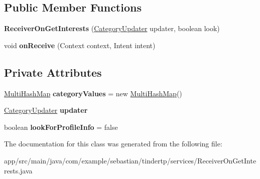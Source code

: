 \subsection*{Public Member Functions}
\begin{DoxyCompactItemize}
\item 
{\bfseries Receiver\+On\+Get\+Interests} (\hyperlink{interfacecom_1_1example_1_1sebastian_1_1tindertp_1_1CategoryUpdater}{Category\+Updater} updater, boolean look)\hypertarget{classcom_1_1example_1_1sebastian_1_1tindertp_1_1services_1_1ReceiverOnGetInterests_a1c6693804f8ebfe6e3bb2f0c51ab4de3}{}\label{classcom_1_1example_1_1sebastian_1_1tindertp_1_1services_1_1ReceiverOnGetInterests_a1c6693804f8ebfe6e3bb2f0c51ab4de3}

\item 
void {\bfseries on\+Receive} (Context context, Intent intent)\hypertarget{classcom_1_1example_1_1sebastian_1_1tindertp_1_1services_1_1ReceiverOnGetInterests_a2617638cb16a02c326c19216f5ddac71}{}\label{classcom_1_1example_1_1sebastian_1_1tindertp_1_1services_1_1ReceiverOnGetInterests_a2617638cb16a02c326c19216f5ddac71}

\end{DoxyCompactItemize}
\subsection*{Private Attributes}
\begin{DoxyCompactItemize}
\item 
\hyperlink{classcom_1_1example_1_1sebastian_1_1tindertp_1_1commonTools_1_1MultiHashMap}{Multi\+Hash\+Map} {\bfseries category\+Values} = new \hyperlink{classcom_1_1example_1_1sebastian_1_1tindertp_1_1commonTools_1_1MultiHashMap}{Multi\+Hash\+Map}()\hypertarget{classcom_1_1example_1_1sebastian_1_1tindertp_1_1services_1_1ReceiverOnGetInterests_a8c47e83a2fbb6717d366a23347f856fe}{}\label{classcom_1_1example_1_1sebastian_1_1tindertp_1_1services_1_1ReceiverOnGetInterests_a8c47e83a2fbb6717d366a23347f856fe}

\item 
\hyperlink{interfacecom_1_1example_1_1sebastian_1_1tindertp_1_1CategoryUpdater}{Category\+Updater} {\bfseries updater}\hypertarget{classcom_1_1example_1_1sebastian_1_1tindertp_1_1services_1_1ReceiverOnGetInterests_ab0981cfbf9c8c630e913828c5f3e5eae}{}\label{classcom_1_1example_1_1sebastian_1_1tindertp_1_1services_1_1ReceiverOnGetInterests_ab0981cfbf9c8c630e913828c5f3e5eae}

\item 
boolean {\bfseries look\+For\+Profile\+Info} = false\hypertarget{classcom_1_1example_1_1sebastian_1_1tindertp_1_1services_1_1ReceiverOnGetInterests_a806d0ec214b020aff41a8f2aa4f93c17}{}\label{classcom_1_1example_1_1sebastian_1_1tindertp_1_1services_1_1ReceiverOnGetInterests_a806d0ec214b020aff41a8f2aa4f93c17}

\end{DoxyCompactItemize}


The documentation for this class was generated from the following file\+:\begin{DoxyCompactItemize}
\item 
app/src/main/java/com/example/sebastian/tindertp/services/Receiver\+On\+Get\+Interests.\+java\end{DoxyCompactItemize}
